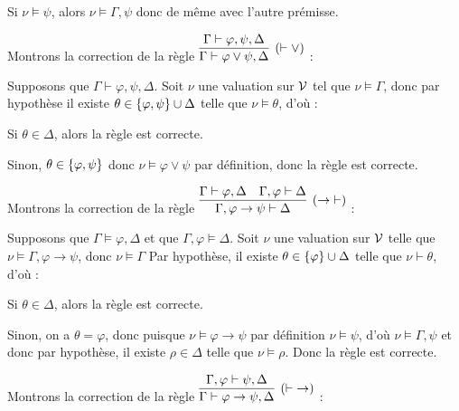 \documentclass[a4paper,french,bookmarks]{article}
\begin{document}
\begin{enumerate}
{\begin{enumerate}
\begin{enumerate}
                    \ithand Si $\nu \vDash \psi$, alors $\nu \vDash \Gamma, \psi$ donc de même avec l'autre prémisse.
                \end{enumerate}
                \medskip
                
                \itt Montrons la correction de la règle $\infer[(\vdash \lor)]{\Gamma \vdash \varphi \lor \psi, \Delta}{\Gamma \vdash \varphi, \psi, \Delta}$ :
                
                Supposons que $\Gamma \vdash \varphi, \psi, \Delta$. Soit $\nu$ une valuation sur $\mathcal{V}$ tel que $\nu \vDash \Gamma$, donc par hypothèse il existe $\theta \in \left\{\varphi, \psi\right\} \cup \Delta$ telle que $\nu \vDash \theta$, d'où :
                \begin{enumerate}
                    \ithand Si $\theta \in \Delta$, alors la règle est correcte.
                    
                    \ithand Sinon, $\theta \in \left\{\varphi, \psi\right\}$ donc $\nu \vDash \varphi \lor \psi$ par définition, donc la règle est correcte.
                \end{enumerate}
                \medskip
                
                \itt Montrons la correction de la règle $\infer[(\rightarrow\;\vdash)]{\Gamma, \varphi \rightarrow \psi \vdash \Delta}{\Gamma \vdash \varphi, \Delta & \Gamma, \varphi \vdash \Delta}$ :
            
                Supposons que $\Gamma \vDash \varphi, \Delta$ et que $\Gamma, \varphi \vDash \Delta$. Soit $\nu$ une valuation sur $\mathcal{V}$ telle que $\nu \vDash \Gamma, \varphi \rightarrow \psi$, donc $\nu \vDash \Gamma$ Par hypothèse, il existe $\theta \in \left\{\varphi\right\} \cup \Delta$ telle que $\nu \vdash \theta$, d'où :
                \begin{enumerate}
                    \ithand Si $\theta \in \Delta$, alors la règle est correcte.
                    
                    \ithand Sinon, on a $\theta = \varphi$, donc puisque $\nu \vDash \varphi \rightarrow \psi$ par définition $\nu \vDash \psi$, d'où $\nu \vDash \Gamma, \psi$ et donc par hypothèse, il existe $\rho \in \Delta$ telle que $\nu \vDash \rho$. Donc la règle est correcte.
                \end{enumerate}
                \medskip
                
                \itt Montrons la correction de la règle $\infer[(\vdash\; \rightarrow)]{\Gamma \vdash \varphi \rightarrow \psi, \Delta}{\Gamma, \varphi \vdash \psi, \Delta}$ :
                

\end{enumerate}}
\end{enumerate}
\end{document}
